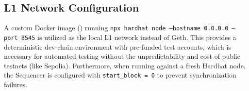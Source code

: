 \subsection{L1 Network Configuration}
\label{sec:deployment_setup}
A custom Docker image () running \texttt{npx hardhat node --hostname 0.0.0.0 --port 8545} is utilized as the local L1 network instead of Geth. This provides a deterministic dev-chain environment with pre-funded test accounts, which is necessary for automated testing without the unpredictability and cost of public testnets (like Sepolia). Furthermore, when running against a fresh Hardhat node, the Sequencer is configured with \texttt{start\_block = 0} to prevent synchronization failures.